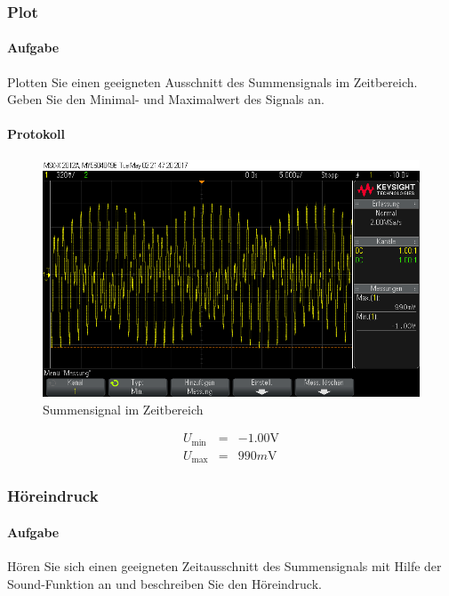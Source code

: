 \documentclass[10pt]{scrreprt}
\begin{document}
        \subsubsection{Plot}
        \paragraph{Aufgabe}
        Plotten Sie einen geeigneten Ausschnitt des Summensignals im Zeitbereich. Geben
        Sie den Minimal- und Maximalwert des Signals an.
        \paragraph{Protokoll}
        \begin{center}
            \begin{figure}[H]
                \includegraphics[width=\textwidth]{Screenshot_GUI_4202.png}
              \caption{Summensignal im Zeitbereich}
            \end{figure}
        \end{center}

        \begin{eqnarray*}
            U_{\min{}} &=& -1.00\si{\volt}\\
            U_{\max{}} &=& 990\si{m\volt}
        \end{eqnarray*}

        \subsubsection{Höreindruck}
        \paragraph{Aufgabe}
        Hören Sie sich einen geeigneten Zeitausschnitt des Summensignals mit Hilfe der
        \glqq{}Sound\grqq{}-Funktion an und beschreiben Sie den Höreindruck.
\end{document}
